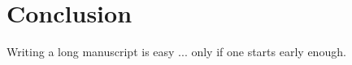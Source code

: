 \chapter{Conclusion}
\label{chap:conclude}

Writing a long manuscript is easy ... only if one starts early enough. 
